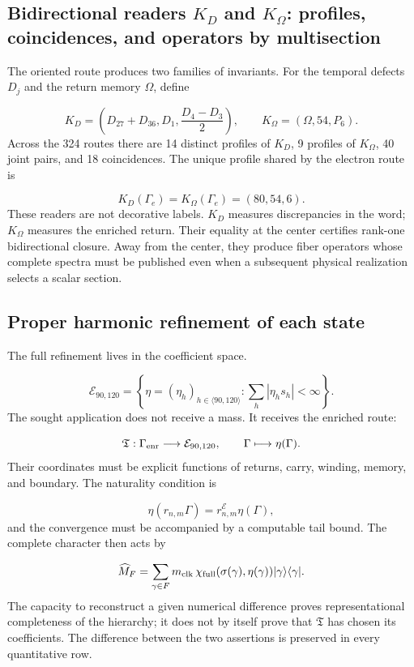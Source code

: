 \subsection{Bidirectional readers \(K_D\) and \(K_\Omega\): profiles, coincidences, and operators by multisection}
The oriented route produces two families of invariants. For the temporal defects \(D_j\) and the return memory \(\Omega\), define

\[
K_D=\left(D_{27}+D_{36},D_1,\frac{D_4-D_3}{2}\right),
\qquad
K_\Omega=(\Omega,54,P_6).
\]
Across the 324 routes there are 14 distinct profiles of \(K_D\), 9 profiles of \(K_\Omega\), 40 joint pairs, and 18 coincidences. The unique profile shared by the electron route is

\[
K_D(\Gamma_e)=K_\Omega(\Gamma_e)=(80,54,6).
\]
These readers are not decorative labels. \(K_D\) measures discrepancies in the word; \(K_\Omega\) measures the enriched return. Their equality at the center certifies rank-one bidirectional closure. Away from the center, they produce fiber operators whose complete spectra must be published even when a subsequent physical realization selects a scalar section.

\subsection{Proper harmonic refinement of each state}
The full refinement lives in the coefficient space.

\[
\mathcal E_{90,120}
=\left\{\eta=(\eta_h)_{h\in\langle90,120\rangle}:
\sum_h|\eta_hs_h|<\infty\right\}.
\]
The sought application does not receive a mass. It receives the enriched route:

\[
\mathfrak T:\Gamma_{\rm enr}\longrightarrow\mathcal E_{90,120},
\qquad
\Gamma\longmapsto\eta(\Gamma).
\]
Their coordinates must be explicit functions of returns, carry, winding, memory, and boundary. The naturality condition is

\[
\eta(r_{n,m}\Gamma)=r^{\mathcal E}_{n,m}\eta(\Gamma),
\]
and the convergence must be accompanied by a computable tail bound. The complete character then acts by

\[
\widehat M_F
=\sum_{\gamma\in F}
m_{\rm clk}\,
\chi_{\rm full}(\sigma(\gamma),\eta(\gamma))
|\gamma\rangle\langle\gamma|.
\]
The capacity to reconstruct a given numerical difference proves representational completeness of the hierarchy; it does not by itself prove that \(\mathfrak T\) has chosen its coefficients. The difference between the two assertions is preserved in every quantitative row.

